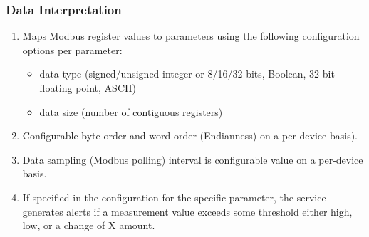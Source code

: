\documentclass[letterpaper,10pt,english]{sphinxmanual}
\begin{document}
\subsubsection{Data Interpretation}
\label{\detokenize{funcspec:data-interpretation}}\begin{enumerate}
\item {} 
Maps Modbus register values to parameters using the following configuration options per parameter:
\begin{itemize}
\item {} 
 data type (signed/unsigned integer or 8/16/32 bits, Boolean, 32-bit floating point, ASCII)

\item {} 
 data size (number of contiguous registers)

\end{itemize}

\item {} 
Configurable byte order and word order (Endianness) on a per device basis).

\item {} 
Data sampling (Modbus polling) interval is configurable value on a per-device basis.

\item {} 
If specified in the configuration for the specific parameter, the service generates alerts if a measurement value exceeds some threshold either high, low, or a change of X amount.

\end{enumerate}
\end{document}
